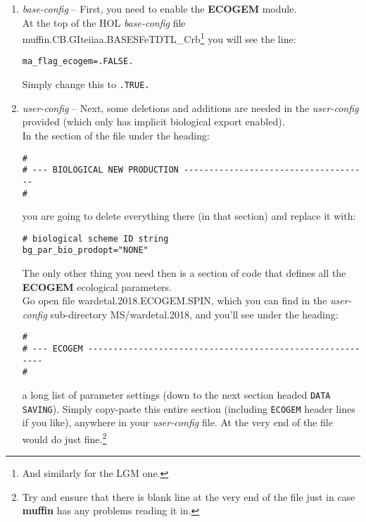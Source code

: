 \documentclass[11pt,fleqn]{book} %
\begin{document}
\begin{enumerate}[noitemsep]

\vspace{1mm}
\item \textit{base-config} -- First, you need to enable the \textbf{ECOGEM} module.
\\At the top of the HOL \textit{base-config} file \textsf{\footnotesize muffin.CB.GIteiiaa.BASESFeTDTL\_Crb}\footnote{And similarly for the LGM one.} you will see the line:
\vspace{-2mm}\begin{verbatim}
ma_flag_ecogem=.FALSE.
\end{verbatim}\vspace{-2mm}
Simply change this to \texttt{.TRUE.}
\vspace{6mm}
\pagebreak 

\vspace{1mm}
\item \textit{user-config} -- Next, some deletions and additions are needed in the \textit{user-config} provided (which only has implicit biological export enabled).
\\In the section of the file under the heading:
\footnotesize\begin{verbatim}
#
# --- BIOLOGICAL NEW PRODUCTION -------------------------------------
#
\end{verbatim}\normalsize
you are going to delete everything there (in that section) and replace it with:
\vspace{-1mm}\begin{verbatim}
# biological scheme ID string
bg_par_bio_prodopt="NONE"
\end{verbatim}\vspace{-1mm}
The only other thing you need then is a section of code that defines all the \textbf{ECOGEM} ecological parameters.
\\ Go open file \textsf{\footnotesize wardetal.2018.ECOGEM.SPIN}, which you can find in the \textit{user-config} sub-directory \textsf{\footnotesize MS/wardetal.2018}, and you'll see under the heading:
\footnotesize\begin{verbatim}
#
# --- ECOGEM ----------------------------------------------------------
#
\end{verbatim}\normalsize
a long list of parameter settings (down to the next section headed \texttt{DATA SAVING}). Simply copy-paste this entire section (including \texttt{ECOGEM} header lines if you like), anywhere in your \textit{user-config} file. At the very end of the file would do just fine.\footnote{Try and ensure that there is blank line at the very end of the file just in case \textbf{muffin} has any problems reading it in.}


\end{enumerate}
\end{document}
